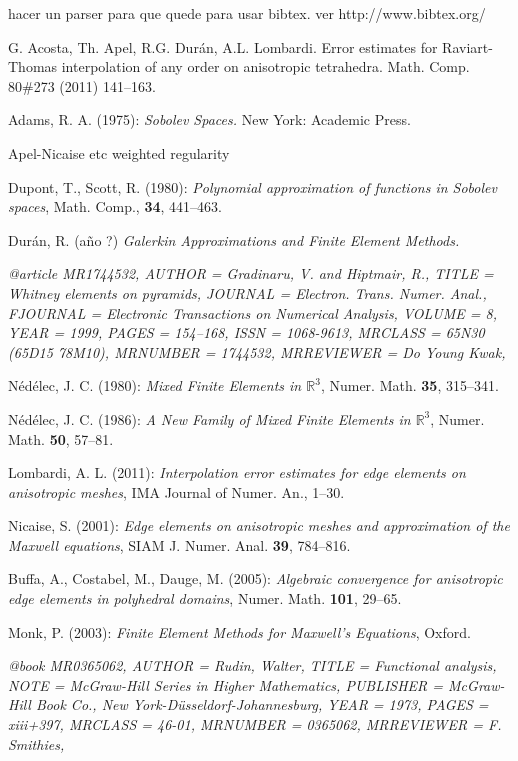 \begin{thebibliography}{9}
 {\color{red} hacer un parser para que quede para usar bibtex.
ver http://www.bibtex.org/}

 G. Acosta, Th. Apel, R.G. Dur\'an, A.L. Lombardi. Error estimates for Raviart-Thomas interpolation of
any order on anisotropic tetrahedra. Math. Comp. 80\#273 (2011) 141--163. 

Adams, R. A. (1975): \emph{Sobolev Spaces.} New York: Academic Press.

Apel-Nicaise etc weighted regularity 

Dupont, T., Scott, R. (1980): \emph{Polynomial approximation of functions in Sobolev spaces},
Math. Comp., \textbf{34}, 441--463.

Dur\'an, R. (a\~no ?) \emph{Galerkin Approximations and Finite Element Methods.}

\emph{
@article {MR1744532,
    AUTHOR = {Gradinaru, V. and Hiptmair, R.},
     TITLE = {Whitney elements on pyramids},
   JOURNAL = {Electron. Trans. Numer. Anal.},
  FJOURNAL = {Electronic Transactions on Numerical Analysis},
    VOLUME = {8},
      YEAR = {1999},
     PAGES = {154--168},
      ISSN = {1068-9613},
   MRCLASS = {65N30 (65D15 78M10)},
  MRNUMBER = {1744532},
MRREVIEWER = {Do Young Kwak},
}}


N\'ed\'elec, J. C. (1980): \emph{Mixed Finite Elements in $\mathbb{R}^3$}, Numer. Math. \textbf{35},
315--341.

N\'ed\'elec, J. C. (1986): \emph{A New Family of Mixed Finite Elements in $\mathbb{R}^3$}, Numer. Math. 
\textbf{50}, 57--81.

Lombardi, A. L. (2011): \emph{Interpolation error estimates for edge elements on anisotropic meshes}, 
IMA Journal of Numer. An., 1--30.

Nicaise, S. (2001): \emph{Edge elements on anisotropic meshes and approximation of the Maxwell equations},
SIAM J. Numer. Anal. \textbf{39}, 784--816.

Buffa, A., Costabel, M., Dauge, M. (2005): \emph{Algebraic convergence for anisotro\-pic edge elements
in polyhedral domains}, Numer. Math. \textbf{101}, 29--65.

Monk, P. (2003): \emph{Finite Element Methods for Maxwell's Equations}, Oxford.

\emph{
@book {MR0365062,
    AUTHOR = {Rudin, Walter},
     TITLE = {Functional analysis},
      NOTE = {McGraw-Hill Series in Higher Mathematics},
 PUBLISHER = {McGraw-Hill Book Co., New York-D\"usseldorf-Johannesburg},
      YEAR = {1973},
     PAGES = {xiii+397},
   MRCLASS = {46-01},
  MRNUMBER = {0365062},
MRREVIEWER = {F. Smithies},
}}

\end{thebibliography}